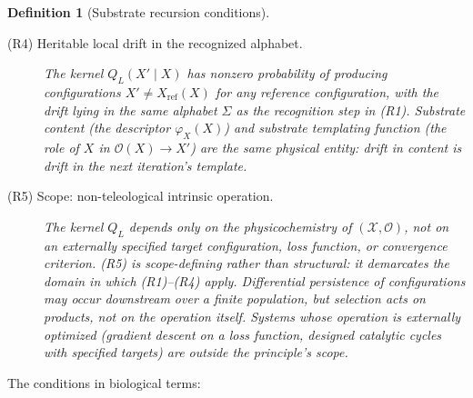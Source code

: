 \documentclass[aps,prx,reprint,amsmath,amssymb,floatfix,superscriptaddress,nofootinbib]{revtex4-2}
\theoremstyle{plain-thm}
\theoremstyle{definition-thm}
\newtheorem{definition}{Definition}
\newcommand{\descX}{\varphi_X}
\newcommand{\Xset}{\mathcal{X}}
\newcommand{\Op}{\mathcal{O}}
\begin{document}
\begin{definition}[Substrate recursion conditions]
\begin{description}
\item[(R4) Heritable local drift in the recognized alphabet.] The kernel $Q_L(X' \mid X)$ has nonzero probability of producing configurations $X' \neq X_{\mathrm{ref}}(X)$ for any reference configuration, with the drift lying in the same alphabet $\Sigma$ as the recognition step in (R1). Substrate content (the descriptor $\descX(X)$) and substrate templating function (the role of $X$ in $\Op(X) \to X'$) are the same physical entity: drift in content is drift in the next iteration's template.

\item[(R5) Scope: non-teleological intrinsic operation.] The kernel $Q_L$ depends only on the physicochemistry of $(\Xset, \Op)$, not on an externally specified target configuration, loss function, or convergence criterion. (R5) is scope-defining rather than structural: it demarcates the domain in which (R1)--(R4) apply. Differential persistence of configurations may occur downstream over a finite population, but selection acts on products, not on the operation itself. Systems whose operation is externally optimized (gradient descent on a loss function, designed catalytic cycles with specified targets) are outside the principle's scope.
\end{description}
\end{definition}

The conditions in biological terms:
\end{document}

